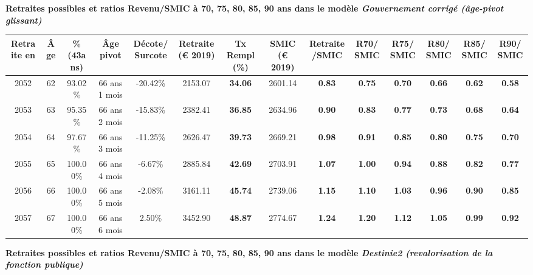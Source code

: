  \vspace{0.1cm} 
{\bf \noindent Retraites possibles et ratios Revenu/SMIC à 70, 75, 80, 85, 90 ans dans le modèle \emph{Gouvernement corrigé (âge-pivot glissant)}}  
 
\begin{adjustbox}{max width=\textwidth} 
\begin{tabular}[htb]{|c|c||c|c|c||c|c||c|c||c|c|c|c|c|} 
\hline 
 Retraite en &  Âge &  \%(43ans) &  Âge pivot &  Décote/Surcote &  Retraite (\euro{} 2019) &  Tx Rempl(\%) &  SMIC (\euro{} 2019) &  Retraite/SMIC &  R70/SMIC &  R75/SMIC &  R80/SMIC &  R85/SMIC &  R90/SMIC \\ 
\hline \hline 
 2052 &  62 &  93.02\% &  66 ans 1 mois &  -20.42\% &  2153.07 &  {\bf 34.06} &  2601.14 &  {\bf {\color{red} 0.83}} &  {\bf {\color{red} 0.75}} &  {\bf {\color{red} 0.70}} &  {\bf {\color{red} 0.66}} &  {\bf {\color{red} 0.62}} &  {\bf {\color{red} 0.58}} \\ 
\hline 
 2053 &  63 &  95.35\% &  66 ans 2 mois &  -15.83\% &  2382.41 &  {\bf 36.85} &  2634.96 &  {\bf {\color{red} 0.90}} &  {\bf {\color{red} 0.83}} &  {\bf {\color{red} 0.77}} &  {\bf {\color{red} 0.73}} &  {\bf {\color{red} 0.68}} &  {\bf {\color{red} 0.64}} \\ 
\hline 
 2054 &  64 &  97.67\% &  66 ans 3 mois &  -11.25\% &  2626.47 &  {\bf 39.73} &  2669.21 &  {\bf {\color{red} 0.98}} &  {\bf {\color{red} 0.91}} &  {\bf {\color{red} 0.85}} &  {\bf {\color{red} 0.80}} &  {\bf {\color{red} 0.75}} &  {\bf {\color{red} 0.70}} \\ 
\hline 
 2055 &  65 &  100.00\% &  66 ans 4 mois &  -6.67\% &  2885.84 &  {\bf 42.69} &  2703.91 &  {\bf 1.07} &  {\bf 1.00} &  {\bf {\color{red} 0.94}} &  {\bf {\color{red} 0.88}} &  {\bf {\color{red} 0.82}} &  {\bf {\color{red} 0.77}} \\ 
\hline 
 2056 &  66 &  100.00\% &  66 ans 5 mois &  -2.08\% &  3161.11 &  {\bf 45.74} &  2739.06 &  {\bf 1.15} &  {\bf 1.10} &  {\bf 1.03} &  {\bf {\color{red} 0.96}} &  {\bf {\color{red} 0.90}} &  {\bf {\color{red} 0.85}} \\ 
\hline 
 2057 &  67 &  100.00\% &  66 ans 6 mois &  2.50\% &  3452.90 &  {\bf 48.87} &  2774.67 &  {\bf 1.24} &  {\bf 1.20} &  {\bf 1.12} &  {\bf 1.05} &  {\bf {\color{red} 0.99}} &  {\bf {\color{red} 0.92}} \\ 
\hline 
\hline 
\end{tabular} 
\end{adjustbox} 
 
 \vspace{0.1cm} 
{\bf \noindent Retraites possibles et ratios Revenu/SMIC à 70, 75, 80, 85, 90 ans dans le modèle \emph{Destinie2 (revalorisation de la fonction publique)}}  
 

